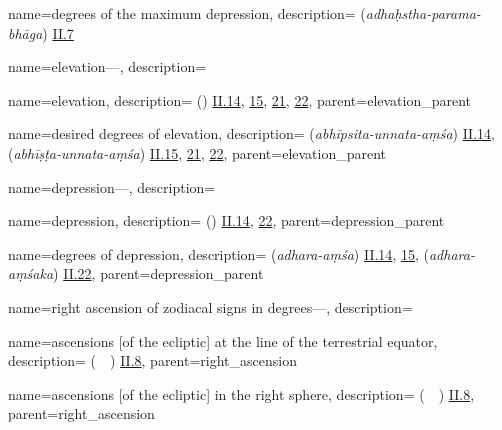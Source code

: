 {
        name={degrees of the maximum depression},
        description={ (\textit{adhaḥstha-parama-bhāga}) \hyperlink{Sii7}{II.7}}
}

{
        name={elevation---},
        description={\phantom{x}\nopagebreak}
}

{
        name={elevation},
        description={ (\irtifa) \hyperlink{Pii14}{II.14}, \hyperlink{Pii15}{15}, \hyperlink{Pii21}{21}, \hyperlink{Pii22}{22}},
        parent={elevation_parent}
}

{
        name={desired degrees of elevation},
        description={ (\textit{abhīpsita-unnata-aṃśa}) \hyperlink{Sii14}{II.14},
          (\textit{abhīṣṭa-unnata-aṃśa}) \hyperlink{Sii15}{II.15}, \hyperlink{Sii21}{21}, \hyperlink{Sii22}{22}},
        parent={elevation_parent}
}

{
        name={depression---},
        description={\phantom{x}\nopagebreak}
}

{
        name={depression},
        description={ (\inkhifad) \hyperlink{Pii14}{II.14}, \hyperlink{Pii22}{22}},
        parent={depression_parent}
}

{
        name={degrees of depression},
        description={ (\textit{adhara-aṃśa}) \hyperlink{Sii14}{II.14}, \hyperlink{Sii15}{15},  (\textit{adhara-aṃśaka}) \hyperlink{Sii22}{II.22}},
        parent={depression_parent}
}

{
        name={right ascension of zodiacal signs in degrees---},
        description={\phantom{x}\nopagebreak}
}

{
        name={ascensions [of the ecliptic] at the line of the terrestrial equator},
        description={\newline {} (\matali\ \khatt\idafaconsonant\ \istiva)
        \hyperlink{Pii8}{II.8}},
        parent={right_ascension}
}

{
        name={ascensions [of the ecliptic] in the right sphere},
        description={ (\matali\ \falak\idafaconsonant\ \mustaqim) \hyperlink{Pii8}{II.8}},
        parent={right_ascension}
}

